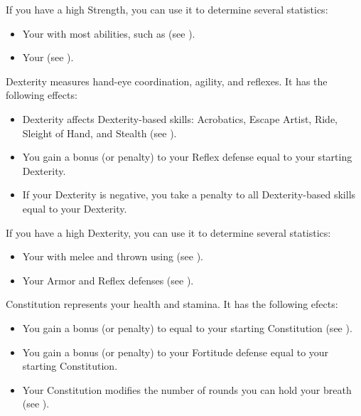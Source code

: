                 If you have a high Strength, you can use it to determine several statistics:
                \begin{itemize}
                    \item Your  with most  abilities, such as  (see ).
                    \item Your  (see ).
                \end{itemize}

            \label{Dexterity}
                Dexterity measures hand-eye coordination, agility, and reflexes.
                It has the following effects:
                \begin{itemize}
                    \item Dexterity affects Dexterity-based skills: Acrobatics, Escape Artist, Ride, Sleight of Hand, and Stealth (see ).
                    \item You gain a bonus (or penalty) to your Reflex defense equal to your starting Dexterity.
                    \item If your Dexterity is negative, you take a penalty to all Dexterity-based skills equal to your Dexterity.
                \end{itemize}

                If you have a high Dexterity, you can use it to determine several statistics:
                \begin{itemize}
                    \item Your  with melee and thrown  using  (see ).
                    \item Your Armor and Reflex defenses (see ).
                \end{itemize}

            \label{Constitution}
                Constitution represents your health and stamina.
                It has the following efects:
                \begin{itemize}
                    \item You gain a bonus (or penalty) to  equal to your starting Constitution (see ).
                    \item You gain a bonus (or penalty) to your Fortitude defense equal to your starting Constitution.
                    \item Your Constitution modifies the number of rounds you can hold your breath (see ).
                \end{itemize}

